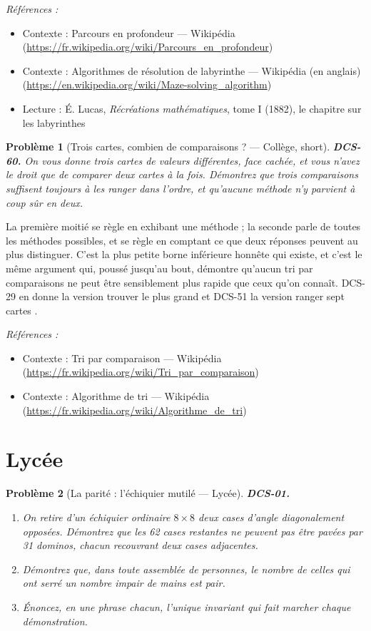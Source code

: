 \documentclass[11pt]{article}
\newtheorem{problem}{Problème}
\newenvironment{refs}{\par\small\noindent\emph{Références :}\begin{itemize}\setlength\itemsep{0pt}}{\end{itemize}\normalsize}
\begin{document}
\begin{refs}
\item Contexte : Parcours en profondeur --- Wikipédia (\url{https://fr.wikipedia.org/wiki/Parcours_en_profondeur})
\item Contexte : Algorithmes de résolution de labyrinthe --- Wikipédia (en anglais) (\url{https://en.wikipedia.org/wiki/Maze-solving_algorithm})
\item Lecture : É. Lucas, \textit{Récréations mathématiques}, tome I (1882), le chapitre sur les labyrinthes
\end{refs}

\bigskip

\begin{problem}[{Trois cartes, combien de comparaisons ? --- Collège, short}]
\textbf{DCS-60.} On vous donne trois cartes de valeurs différentes, face
cachée, et vous n'avez le droit que de comparer deux cartes à la fois. Démontrez que trois
comparaisons suffisent toujours à les ranger dans l'ordre, et qu'aucune méthode n'y parvient
à coup sûr en deux.
\end{problem}

\noindent La première moitié se règle en exhibant une méthode ; la seconde parle de
toutes les méthodes possibles, et se règle en comptant ce que deux réponses peuvent au plus
distinguer. C'est la plus petite borne inférieure honnête qui existe, et c'est le même
argument qui, poussé jusqu'au bout, démontre qu'aucun tri par comparaisons ne peut être
sensiblement plus rapide que ceux qu'on connaît. DCS-29 en donne la version \og{} trouver le plus
grand \fg{} et DCS-51 la version \og{} ranger sept cartes \fg{}.

\begin{refs}
\item Contexte : Tri par comparaison --- Wikipédia (\url{https://fr.wikipedia.org/wiki/Tri_par_comparaison})
\item Contexte : Algorithme de tri --- Wikipédia (\url{https://fr.wikipedia.org/wiki/Algorithme_de_tri})
\end{refs}

\bigskip


\section*{Lycée}

\begin{problem}[{La parité : l'échiquier mutilé --- Lycée}]
\textbf{DCS-01.} \begin{enumerate}
\item[(a)] On retire d'un échiquier ordinaire $8 \times 8$ deux cases d'angle diagonalement opposées. Démontrez que les 62 cases restantes ne peuvent pas être pavées par 31 dominos, chacun recouvrant deux cases adjacentes.
\item[(b)] Démontrez que, dans toute assemblée de personnes, le nombre de celles qui ont serré un nombre impair de mains est pair.
\item[(c)] Énoncez, en une phrase chacun, l'unique invariant qui fait marcher chaque démonstration.
\end{enumerate}

\end{problem}
\end{document}
